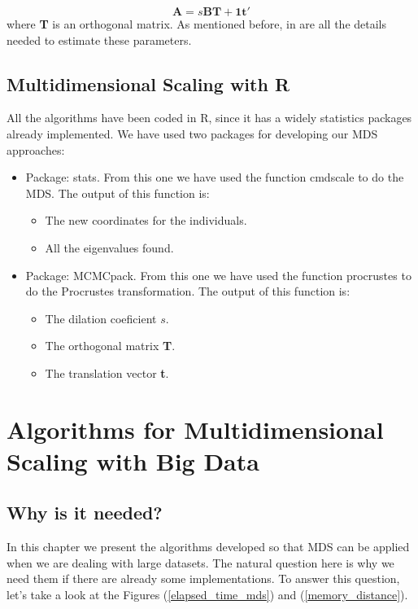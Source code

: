 \documentclass[11pt]{report}
\begin{document}
\[
\mathbf{A} = s \mathbf{B} \mathbf{T} + \mathbf{1t}'
\]
where \textbf{T} is an orthogonal matrix. As mentioned before, 
in \cite{BorgGroenen2005} are all the details needed to estimate 
these parameters.

\section{Multidimensional Scaling with \textsf{R}}

All the algorithms have been coded in \textsf{R}, since it has a widely 
statistics packages already implemented. We have used two packages for 
developing our MDS approaches:

\begin{itemize}
\item Package: \textsf{stats}. From this one we have used the function 
\textsf{cmdscale} to do the MDS. The output of this function is:
\begin{itemize}
\item The new coordinates for the individuals.
\item All the eigenvalues found.
\end{itemize}
\item Package: \textsf{MCMCpack}. From this one we have used the function 
\textsf{procrustes} to do the Procrustes transformation. The output of 
this function is:
\begin{itemize}
\item The dilation coeficient $s$.
\item The orthogonal matrix \textbf{T}.
\item The translation vector \textbf{t}.
\end{itemize}
\end{itemize}

\chapter{Algorithms for Multidimensional Scaling with Big Data}

\section{Why is it needed?}
In this chapter we present the algorithms developed so that MDS can be applied
when we are dealing with large datasets. The natural question here is why we need 
them if there are already some implementations. To answer this question, let's 
take a look at the Figures (\ref{elapsed_time_mds}) and (\ref{memory_distance}).
\end{document}
